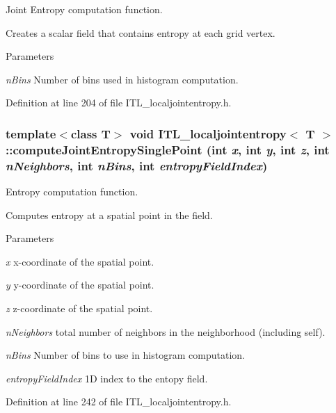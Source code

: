 Joint Entropy computation function. 

Creates a scalar field that contains entropy at each grid vertex. 
\begin{DoxyParams}{Parameters}
\item[{\em nBins}]Number of bins used in histogram computation. \end{DoxyParams}


Definition at line 204 of file ITL\_\-localjointentropy.h.

\hypertarget{classITL__localjointentropy_addf9e3b48606d41d21d3f8de92e301dc}{
\subsubsection[{computeJointEntropySinglePoint}]{\setlength{\rightskip}{0pt plus 5cm}template$<$class T$>$ void {\bf ITL\_\-localjointentropy}$<$ T $>$::computeJointEntropySinglePoint (int {\em x}, \/  int {\em y}, \/  int {\em z}, \/  int {\em nNeighbors}, \/  int {\em nBins}, \/  int {\em entropyFieldIndex})}}
\label{classITL__localjointentropy_addf9e3b48606d41d21d3f8de92e301dc}


Entropy computation function. 

Computes entropy at a spatial point in the field. 
\begin{DoxyParams}{Parameters}
\item[{\em x}]x-\/coordinate of the spatial point. \item[{\em y}]y-\/coordinate of the spatial point. \item[{\em z}]z-\/coordinate of the spatial point. \item[{\em nNeighbors}]total number of neighbors in the neighborhood (including self). \item[{\em nBins}]Number of bins to use in histogram computation. \item[{\em entropyFieldIndex}]1D index to the entopy field. \end{DoxyParams}


Definition at line 242 of file ITL\_\-localjointentropy.h.

